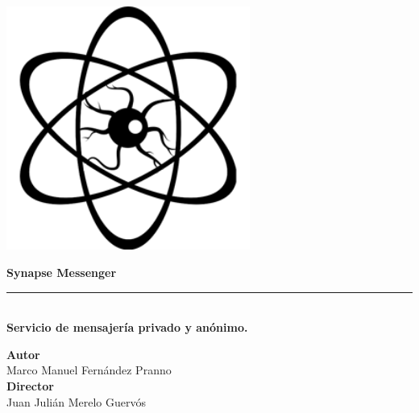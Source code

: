 \begin{titlepage}
 
\setlength{\centeroffset}{-0.5\oddsidemargin}
\addtolength{\centeroffset}{0.5\evensidemargin}
\thispagestyle{empty}

\noindent\hspace*{\centeroffset}\begin{minipage}{\textwidth}

\centering

\includegraphics[width=0.6\textwidth]{imagenes/logo.png} 
\vspace{2.5cm}

{\Huge\bfseries Synapse Messenger\\}
\noindent\rule[-1ex]{\textwidth}{3pt}\\[3.5ex]
{\large\bfseries Servicio de mensajería privado y anónimo.\\[4cm]}
\end{minipage}

\vspace{2.5cm}
\noindent\hspace*{\centeroffset}\begin{minipage}{\textwidth}
\centering

\textbf{Autor}\\ {Marco Manuel Fernández Pranno}\\[2.5ex]
\textbf{Director}\\
{Juan Julián Merelo Guervós}\\[2cm]
\end{minipage}

\end{titlepage}


